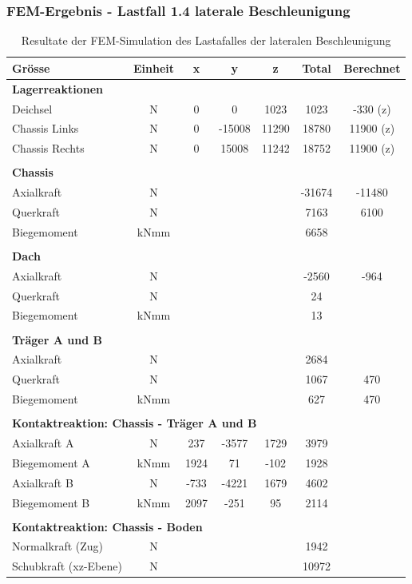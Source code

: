  \subsubsection{FEM-Ergebnis - Lastfall 1.4 laterale Beschleunigung}
  \begin{table}[H]
  \centering
  \begin{tabular}{lcccccc}
  Grösse	&	Einheit	&	x	&	y	&	z	&	Total	&	Berechnet	\\	\hline
  \multicolumn{5}{l}{\textbf{Lagerreaktionen}}									&		&		\\	\thickhline
  Deichsel	&	N	&	0	&	0	&	1023	&	1023	&	-330 (z)	\\
  Chassis Links	&	N	&	0	&	-15008	&	11290	&	18780	&	11900 (z)	\\
  Chassis Rechts	&	N	&	0	&	15008	&	11242	&	18752	&	11900 (z)	\\	\hline	\\
  \multicolumn{5}{l}{\textbf{Chassis}}									&		&		\\	\thickhline
  Axialkraft	&	N	&		&		&		&	-31674	&	-11480	\\
  Querkraft	&	N	&		&		&		&	7163	&	6100	\footnotemark \\
  Biegemoment	&	kNmm	&		&		&		&	6658	&		\\	\hline	\\
  \multicolumn{5}{l}{\textbf{Dach}}									&		&		\\	\thickhline
  Axialkraft	&	N	&		&		&		&	-2560	&	-964	\\
  Querkraft	&	N	&		&		&		&	24	&		\\
  Biegemoment	&	kNmm	&		&		&		&	13	&		\\	\hline	\\
  \multicolumn{5}{l}{\textbf{Träger A und B}}													\\	\thickhline
  Axialkraft	&	N	&		&		&		&	2684	&		\\
  Querkraft	&	N	&		&		&		&	1067	&	470	\\
  Biegemoment	&	kNmm	&		&		&		&	627	&	470	\\	\hline	\\
  \multicolumn{5}{l}{\textbf{Kontaktreaktion: Chassis - Träger A und B}}									&		&		\\	\thickhline
   Axialkraft A	&	N	&	237	&	-3577	&	1729	&	3979	&		\\
  Biegemoment A	&	kNmm	&	1924	&	71	&	-102	&	1928	&		\\
  Axialkraft B	&	N	&	-733	&	-4221	&	1679	&	4602	&		\\
  Biegemoment B	&	kNmm	&	2097	&	-251	&	95	&	2114	&		\\	\hline	\\
  \multicolumn{5}{l}{\textbf{Kontaktreaktion: Chassis - Boden}}									&		&		\\	\thickhline
  Normalkraft (Zug)	&	N	&		&		&		&	1942	&		\\
  Schubkraft (xz-Ebene)	&	N	&		&		&		&	10972	&		\\	\hline
  \end{tabular}
  \caption{Resultate der FEM-Simulation des Lastafalles der lateralen Beschleunigung}
  \label{tab:FEM 1.4}
  \end{table}
